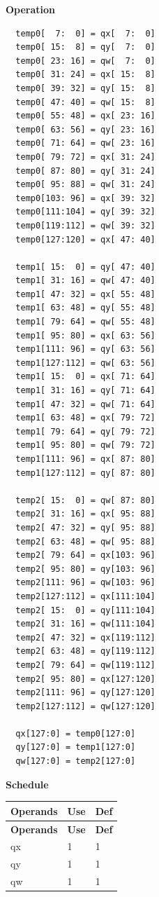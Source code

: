 \textbf{Operation}\\
\begin{lstlisting}
  temp0[  7:  0] = qx[  7:  0]
  temp0[ 15:  8] = qy[  7:  0]
  temp0[ 23: 16] = qw[  7:  0]
  temp0[ 31: 24] = qx[ 15:  8]
  temp0[ 39: 32] = qy[ 15:  8]
  temp0[ 47: 40] = qw[ 15:  8]
  temp0[ 55: 48] = qx[ 23: 16]
  temp0[ 63: 56] = qy[ 23: 16]
  temp0[ 71: 64] = qw[ 23: 16]
  temp0[ 79: 72] = qx[ 31: 24]
  temp0[ 87: 80] = qy[ 31: 24]
  temp0[ 95: 88] = qw[ 31: 24]
  temp0[103: 96] = qx[ 39: 32]
  temp0[111:104] = qy[ 39: 32]
  temp0[119:112] = qw[ 39: 32]
  temp0[127:120] = qx[ 47: 40]

  temp1[ 15:  0] = qy[ 47: 40]
  temp1[ 31: 16] = qw[ 47: 40]
  temp1[ 47: 32] = qx[ 55: 48]
  temp1[ 63: 48] = qy[ 55: 48]
  temp1[ 79: 64] = qw[ 55: 48]
  temp1[ 95: 80] = qx[ 63: 56]
  temp1[111: 96] = qy[ 63: 56]
  temp1[127:112] = qw[ 63: 56]
  temp1[ 15:  0] = qx[ 71: 64]
  temp1[ 31: 16] = qy[ 71: 64]
  temp1[ 47: 32] = qw[ 71: 64]
  temp1[ 63: 48] = qx[ 79: 72]
  temp1[ 79: 64] = qy[ 79: 72]
  temp1[ 95: 80] = qw[ 79: 72]
  temp1[111: 96] = qx[ 87: 80]
  temp1[127:112] = qy[ 87: 80]

  temp2[ 15:  0] = qw[ 87: 80]
  temp2[ 31: 16] = qx[ 95: 88]
  temp2[ 47: 32] = qy[ 95: 88]
  temp2[ 63: 48] = qw[ 95: 88]
  temp2[ 79: 64] = qx[103: 96]
  temp2[ 95: 80] = qy[103: 96]
  temp2[111: 96] = qw[103: 96]
  temp2[127:112] = qx[111:104]
  temp2[ 15:  0] = qy[111:104]
  temp2[ 31: 16] = qw[111:104]
  temp2[ 47: 32] = qx[119:112]
  temp2[ 63: 48] = qy[119:112]
  temp2[ 79: 64] = qw[119:112]
  temp2[ 95: 80] = qx[127:120]
  temp2[111: 96] = qy[127:120]
  temp2[127:112] = qw[127:120]

  qx[127:0] = temp0[127:0]
  qy[127:0] = temp1[127:0]
  qw[127:0] = temp2[127:0]
\end{lstlisting}

\textbf{Schedule}\\
\begin{longtable}[c]{|l|l|l|}
    \hline
    \rowcolor{lightgray}
    \textbf{Operands} & \textbf{Use} & \textbf{Def} \\\hline
    \endfirsthead
    \hline
    \rowcolor{lightgray}
     \textbf{Operands} & \textbf{Use} & \textbf{Def} \\\hline
    \endhead
    \hline
    \endfoot

  qx & 1 & 1 \\\hline
  qy & 1 & 1 \\\hline
  qw & 1 & 1

\end{longtable}

